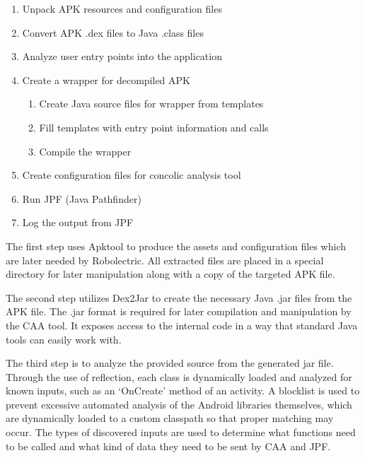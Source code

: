 \documentclass{sig-alternate}
\begin{document}
\begin{enumerate}

    \setlength{\itemsep}{0pt} %
    \setlength{\parskip}{0pt} %
    \setlength{\parsep}{0pt}  %

 \item Unpack APK resources and configuration files
 \item Convert APK .dex files to Java .class files
  \item Analyze user entry points into the application
 \item Create a wrapper for decompiled APK
 \begin{enumerate}
	\itemsep-.2em %
 	\item Create Java source files for wrapper from templates
 	\item Fill templates with entry point information and calls
 	\item Compile the wrapper
 \end{enumerate}
 \item Create configuration files for concolic analysis tool
 \item Run JPF (Java Pathfinder)
 \item Log the output from JPF
 \end{enumerate}



The first step uses Apktool to produce the assets and configuration files which are later needed by Robolectric. All extracted files are placed in a special directory for later manipulation along with a copy of the targeted APK file. %

The second step utilizes Dex2Jar to create the necessary Java .jar files from the APK file. The .jar format is required for later compilation and manipulation by the CAA tool. It exposes access to the internal code in a way that standard Java tools can easily work with. %

The third step is to analyze the provided source from the generated jar file. Through the use of reflection, each class is dynamically loaded and analyzed for known inputs, such as an `OnCreate' method of an activity. A blocklist is used to prevent excessive automated analysis of the Android libraries themselves, which are dynamically loaded to a custom classpath so that proper matching may occur. The types of discovered inputs are used to determine what functions need to be called and what kind of data they need to be sent by CAA and JPF.
\end{document}
